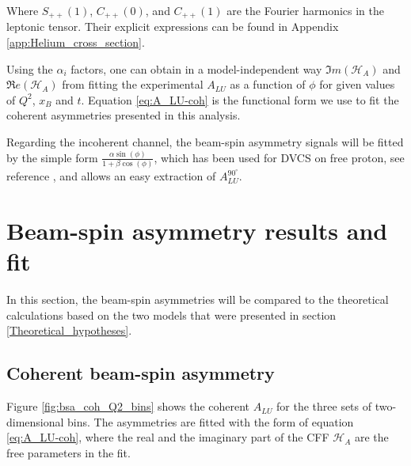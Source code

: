 Where $S_{++}(1)$, $C_{++}(0)$, and $C_{++}(1)$ are the Fourier harmonics in the 
leptonic tensor. Their explicit expressions can be found in Appendix 
\ref{app:Helium_cross_section}.  

Using the $\alpha_{i}$ factors, one can obtain in a model-independent way $\Im
m(\mathcal{H}_{A})$ and $\Re e(\mathcal{H}_{A})$ from fitting the experimental 
$A_{LU}$ as a function of $\phi$ for given values of $Q^2$, $x_B$ and $t$.  
Equation \ref{eq:A_LU-coh} is the functional form we use to fit the coherent asymmetries 
presented in this analysis. 

Regarding the incoherent channel, the beam-spin 
asymmetry signals will be fitted by the simple form $\frac{\alpha \sin(\phi)}{1 + 
\beta \cos(\phi)}$, which has been used for DVCS on free proton, see reference 
\cite{FX_BSA, FX_analysis_note}, and allows an easy extraction of 
$A^{90^{\circ}}_{LU}$.  


\section{Beam-spin asymmetry results and fit}
In this section, the beam-spin asymmetries will be compared to the theoretical 
calculations based on the two models that were presented in section 
\ref{Theoretical_hypotheses}.

\subsection{Coherent beam-spin asymmetry}
Figure \ref{fig:bsa_coh_Q2_bins} shows the coherent $A_{LU}$ for the three 
sets of two-dimensional bins. The asymmetries are fitted with the form of
equation \ref{eq:A_LU-coh}, where the real and the imaginary part of the CFF 
$\mathcal{H}_{A}$ are the free parameters in the fit.

